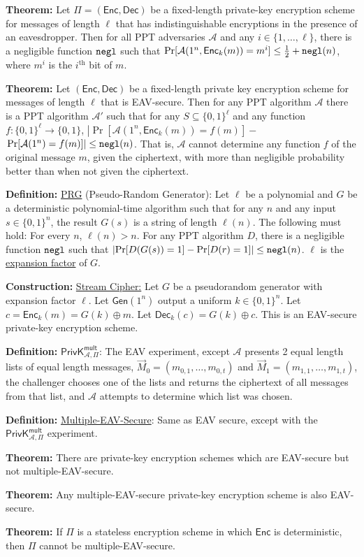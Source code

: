 \documentclass[10pt]{article}
\newcommand{\AAA}{\mathcal{A}}
\newcommand{\defn}[1]{{\bf Definition:} \underline{#1}}
\newcommand{\thm}[1]{{\bf Theorem:} \underline{#1}}
\newcommand{\con}[1]{{\bf Construction:} \underline{#1}}
\newcommand{\Enc}{\mathsf{Enc}}
\newcommand{\Dec}{\mathsf{Dec}}
\newcommand{\Gen}{\mathsf{Gen}}
\newcommand{\ExptMultArgs}[2]{\mathsf{PrivK}^{\mathsf{mult}}_{#1,#2}}
\newcommand{\ExptMult}{\ExptMultArgs{\AAA}{\Pi}}
\newcommand{\xor}{\oplus}
\newcommand{\negl}{{\tt negl}}
\begin{document}
\begin{multicols}{4}
\thm{}Let $\Pi=(\Enc,\Dec)$ be a fixed-length private-key encryption scheme for messages of length $\ell$ that has indistinguishable encryptions in the presence of an eavesdropper. Then for all PPT adversaries $\AAA$ and any $i\in\{1,\dots,\ell\}$, there is a negligible function $\negl$ such that $\Pr[\AAA(1^n,\Enc_k(m))=m^i]\leq\frac{1}{2}+\negl(n)$, where $m^i$ is the $i^{\text{th}}$ bit of $m$.

\thm{}Let $(\Enc,\Dec)$ be a fixed-length private key encryption scheme for messages of length $\ell$ that is EAV-secure. Then for any PPT algorithm $\AAA$ there is a PPT algorithm $\AAA'$ such that for any $S\subseteq\{0,1\}^\ell$ and any function $f:\{0,1\}^\ell\to\{0,1\}$, $\left|\Pr[\AAA(1^n,\Enc_k(m))=f(m)]-\right.$ $\left.\Pr[\AAA(1^n)=f(m)]\right|\leq\negl(n)$. That is, $\AAA$ cannot determine any function $f$ of the original message $m$, given the ciphertext, with more than negligible probability better than when not given the ciphertext.

\defn{PRG} (Pseudo-Random Generator): Let $\ell$ be a polynomial and $G$ be a deterministic polynomial-time algorithm such that for any $n$ and any input $s\in\{0,1\}^n$, the result $G(s)$ is a string of length $\ell(n)$. The following must hold: For every $n$, $\ell(n)>n$. For any PPT algorithm $D$, there is a negligible function $\negl$ such that $\left|\Pr[D(G(s))=1]-\Pr[D(r)=1]\right|\leq\negl(n)$. $\ell$ is the \underline{expansion factor} of $G$.

\con{Stream Cipher:} Let $G$ be a pseudorandom generator with expansion factor $\ell$. Let $\Gen(1^n)$ output a uniform $k\in\{0,1\}^n$. Let $c=\Enc_k(m)=G(k)\xor m$. Let $\Dec_k(c)=G(k)\xor c$. This is an EAV-secure private-key encryption scheme.

\defn{$\ExptMult$}: The EAV experiment, except $\AAA$ presents 2 equal length lists of equal length messages, $\vec{M}_0=(m_{0,1},\dots,m_{0,t})$ and $\vec{M}_1=(m_{1,1},\dots,m_{1,t})$, the challenger chooses one of the lists and returns the ciphertext of all messages from that list, and $\AAA$ attempts to determine which list was chosen.

\defn{Multiple-EAV-Secure}: Same as EAV secure, except with the $\ExptMult$ experiment.

\thm{}There are private-key encryption schemes which are EAV-secure but not multiple-EAV-secure.

\thm{}Any multiple-EAV-secure private-key encryption scheme is also EAV-secure.

\thm{}If $\Pi$ is a stateless encryption scheme in which $\Enc$ is deterministic, then $\Pi$ cannot be multiple-EAV-secure.


\end{multicols}
\end{document}
